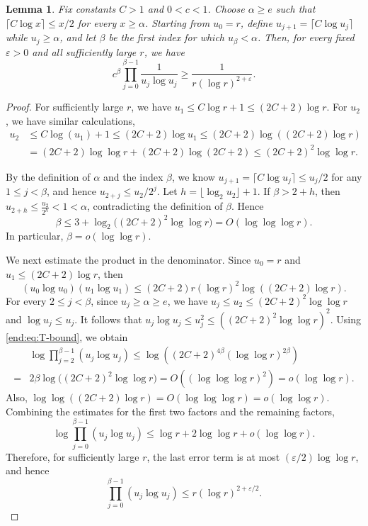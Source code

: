 \documentclass[10pt,a4paper]{amsart}
\numberwithin{equation}{section}
\newtheorem{lemma}[theorem]{Lemma}
\begin{document}
\begin{lemma}\label{end:lem:product} 
Fix constants $C>1$ and $0<c<1$.  Choose $\alpha\geq e$ such that
$\lceil C\log x\rceil\le x/2$ for every $x\ge \alpha$.  Starting from $u_0=r$, define
$u_{j+1}=\lceil C\log u_j\rceil$ while $u_j\ge \alpha$, and let $\beta$ be the first index for which $u_\beta<\alpha$.  Then, for every fixed $\varepsilon>0$ and all sufficiently large $r$, we have
$$ c^\beta\prod_{j=0}^{\beta-1}\frac1{u_j\log u_j}
 \ge\frac1{r(\log r)^{2+\varepsilon}}.$$
\end{lemma}

\begin{proof}
For sufficiently large $r$, we have
$u_1\le C\log r+1\le(2C+2)\log r$.
For $u_2$, we have similar calculations, 
\begin{align*}
  u_2&\le C\log(u_1)+1\le (2C+2)\log u_1\le (2C+2)\log ((2C+2)\log r) \\
 &=(2C+2)\log \log r+(2C+2)\log (2C+2)\le (2C+2)^2\log \log r.
\end{align*}

By the definition of $\alpha$ and the index $\beta$, we know $u_{j+1}=\lceil C\log u_j\rceil \le u_j/2$ for any $1\le j<\beta $, and hence $u_{2+j}\le u_2/2^j$.
Let $h=\lfloor\log_2u_2\rfloor+1$.  If  $\beta >2+h$, then   $u_{2+h}\le \frac{u_2}{2^h}<1<\alpha$, contradicting the definition of $\beta$. Hence
\begin{equation}\label{end:eq:T-bound}
 \beta\le3+\log_2\big((2C+2)^2\log\log r\big)
 =O(\log\log\log r).
\end{equation}
In particular, $\beta=o(\log\log r)$.

We next estimate the product in the denominator.  Since $u_0=r$ and
$u_1\le(2C+2)\log r$, then
$$ (u_0\log u_0)(u_1\log u_1)
 \le(2C+2)r(\log r)^2\log((2C+2)\log r).$$
For every $2\le j<\beta$,  since $u_j\ge \alpha\ge e$, we have
$u_j\le u_2\le(2C+2)^2\log\log r$ and
$\log u_j\le u_j$.  It follows that
$u_j\log u_j\le u_j^2\le((2C+2)^2\log\log r)^2$.
Using \eqref{end:eq:T-bound}, we obtain
\begin{align*}
 &\log\prod_{j=2}^{\beta-1}(u_j\log u_j)
\le \log((2C+2)^{4\beta}(\log\log r)^{2\beta})\\
=&2\beta\log\big((2C+2)^2\log\log r\big)
 =O((\log\log\log r)^2)
 =o(\log\log r).   
\end{align*}
Also,
$\log\log((2C+2)\log r)=O(\log\log\log r)=o(\log\log r)$.
Combining the estimates for the first two factors and the remaining factors,
$$ \log\prod_{j=0}^{\beta-1}(u_j\log u_j)
 \le\log r+2\log\log r+o(\log\log r).$$
Therefore, for sufficiently large $r$, the last error term is at most
$(\varepsilon/2)\log\log r$, and hence
\begin{equation}\label{end:eq:prod-upper}
 \prod_{j=0}^{\beta-1}(u_j\log u_j)
 \le r(\log r)^{2+\varepsilon/2}.
\end{equation}


\end{proof}
\end{document}

